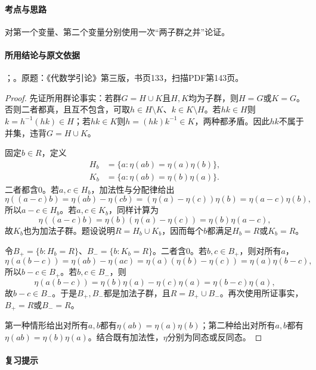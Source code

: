 \paragraph{考点与思路}

对第一个变量、第二个变量分别使用一次“两子群之并”论证。

\paragraph{所用结论与原文依据}

；。原题：《代数学引论》第三版，书页133，扫描PDF第143页。


\begin{proof}

先证所用群论事实：若群$G=H\cup K$且$H,K$均为子群，则$H=G$或$K=G$。否则二者都真，且互不包含，可取$h\in H\setminus K$、$k\in K\setminus H$。若$hk\in H$则$k=h^{-1}(hk)\in H$；若$hk\in K$则$h=(hk)k^{-1}\in K$，两种都矛盾。因此$hk$不属于并集，违背$G=H\cup K$。

固定$b\in R$，定义
\begin{align*}
H_b&=\{a:\eta(ab)=\eta(a)\eta(b)\},\\
K_b&=\{a:\eta(ab)=\eta(b)\eta(a)\}.
\end{align*}
二者都含$0$。若$a,c\in H_b$，加法性与分配律给出
\[
\eta((a-c)b)=\eta(ab)-\eta(cb)
=(\eta(a)-\eta(c))\eta(b)=\eta(a-c)\eta(b),
\]
所以$a-c\in H_b$。若$a,c\in K_b$，同样计算为
\[
\eta((a-c)b)=\eta(b)(\eta(a)-\eta(c))=\eta(b)\eta(a-c),
\]
故$K_b$也为加法子群。题设说明$R=H_b\cup K_b$，因而每个$b$都满足$H_b=R$或$K_b=R$。

令$B_+=\{b:H_b=R\}$、$B_-=\{b:K_b=R\}$。二者含$0$。若$b,c\in B_+$，则对所有$a$，
\[
\eta(a(b-c))=\eta(ab)-\eta(ac)=\eta(a)(\eta(b)-\eta(c))=\eta(a)\eta(b-c),
\]
所以$b-c\in B_+$。若$b,c\in B_-$，则
\[
\eta(a(b-c))=\eta(b)\eta(a)-\eta(c)\eta(a)=\eta(b-c)\eta(a),
\]
故$b-c\in B_-$。于是$B_+,B_-$都是加法子群，且$R=B_+\cup B_-$。再次使用所证事实，$B_+=R$或$B_-=R$。

第一种情形给出对所有$a,b$都有$\eta(ab)=\eta(a)\eta(b)$；第二种给出对所有$a,b$都有$\eta(ab)=\eta(b)\eta(a)$。结合既有加法性，$\eta$分别为同态或反同态。

\end{proof}

\paragraph{复习提示}

